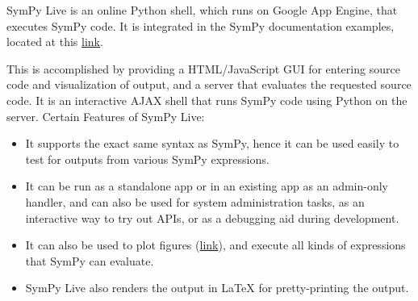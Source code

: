 
SymPy Live is an online Python shell, which runs on Google
App Engine, that executes SymPy code. It is integrated in the SymPy
documentation examples, located at this \href{http://docs.sympy.org/latest/index.html}{link}.

This is accomplished by providing a HTML/JavaScript GUI for entering
source code and visualization of output, and a server that
evaluates the requested source code. It is an interactive AJAX shell
that runs SymPy code using Python on the server.
\newline
Certain Features of SymPy Live:

\begin{itemize}
\item
  It supports the exact same syntax as SymPy, hence it can be used
  easily to test for outputs from various SymPy expressions.
\item
  It can be run as a standalone app or in an existing app as an
  admin-only handler, and can also be used for system administration
  tasks, as an interactive way to try out APIs, or as a debugging aid
  during development.
\item
  It can also be used to plot figures (\href{http://live.sympy.org/?evaluate=from\%20sympy\%20import\%20symbols\%0Afrom\%20sympy.plotting\%20import\%20textplot\%0Ax\%20\%3D\%20symbols(\%27x\%27)\%0Atextplot(x**2\%2C0\%2C5)\%0A\%23--\%0A}{link}),
  and execute all kinds of expressions that SymPy can evaluate.
\item
SymPy Live also renders the output in LaTeX for pretty-printing the
output.
\end{itemize}
